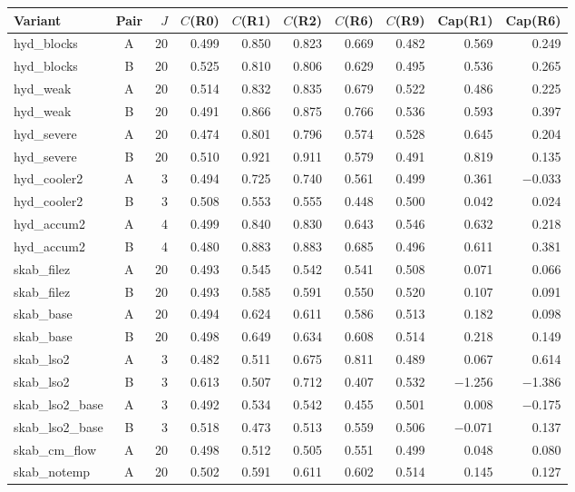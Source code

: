 \begin{tabular}{@{}l c r rrrrrrr@{}}
\toprule
Variant & Pair & $J$ & $C$(R0) & $C$(R1) & $C$(R2) & $C$(R6) & $C$(R9) & Cap(R1) & Cap(R6) \\
\midrule
hyd\_blocks & A & 20 & 0.499 & 0.850 & 0.823 & 0.669 & 0.482 & 0.569 & 0.249 \\
hyd\_blocks & B & 20 & 0.525 & 0.810 & 0.806 & 0.629 & 0.495 & 0.536 & 0.265 \\
hyd\_weak & A & 20 & 0.514 & 0.832 & 0.835 & 0.679 & 0.522 & 0.486 & 0.225 \\
hyd\_weak & B & 20 & 0.491 & 0.866 & 0.875 & 0.766 & 0.536 & 0.593 & 0.397 \\
hyd\_severe & A & 20 & 0.474 & 0.801 & 0.796 & 0.574 & 0.528 & 0.645 & 0.204 \\
hyd\_severe & B & 20 & 0.510 & 0.921 & 0.911 & 0.579 & 0.491 & 0.819 & 0.135 \\
hyd\_cooler2 & A & 3 & 0.494 & 0.725 & 0.740 & 0.561 & 0.499 & 0.361 & $-$0.033 \\
hyd\_cooler2 & B & 3 & 0.508 & 0.553 & 0.555 & 0.448 & 0.500 & 0.042 & 0.024 \\
hyd\_accum2 & A & 4 & 0.499 & 0.840 & 0.830 & 0.643 & 0.546 & 0.632 & 0.218 \\
hyd\_accum2 & B & 4 & 0.480 & 0.883 & 0.883 & 0.685 & 0.496 & 0.611 & 0.381 \\
skab\_filez & A & 20 & 0.493 & 0.545 & 0.542 & 0.541 & 0.508 & 0.071 & 0.066 \\
skab\_filez & B & 20 & 0.493 & 0.585 & 0.591 & 0.550 & 0.520 & 0.107 & 0.091 \\
skab\_base & A & 20 & 0.494 & 0.624 & 0.611 & 0.586 & 0.513 & 0.182 & 0.098 \\
skab\_base & B & 20 & 0.498 & 0.649 & 0.634 & 0.608 & 0.514 & 0.218 & 0.149 \\
skab\_lso2 & A & 3 & 0.482 & 0.511 & 0.675 & 0.811 & 0.489 & 0.067 & 0.614 \\
skab\_lso2 & B & 3 & 0.613 & 0.507 & 0.712 & 0.407 & 0.532 & $-$1.256 & $-$1.386 \\
skab\_lso2\_base & A & 3 & 0.492 & 0.534 & 0.542 & 0.455 & 0.501 & 0.008 & $-$0.175 \\
skab\_lso2\_base & B & 3 & 0.518 & 0.473 & 0.513 & 0.559 & 0.506 & $-$0.071 & 0.137 \\
skab\_cm\_flow & A & 20 & 0.498 & 0.512 & 0.505 & 0.551 & 0.499 & 0.048 & 0.080 \\
skab\_notemp & A & 20 & 0.502 & 0.591 & 0.611 & 0.602 & 0.514 & 0.145 & 0.127 \\

\end{tabular}
